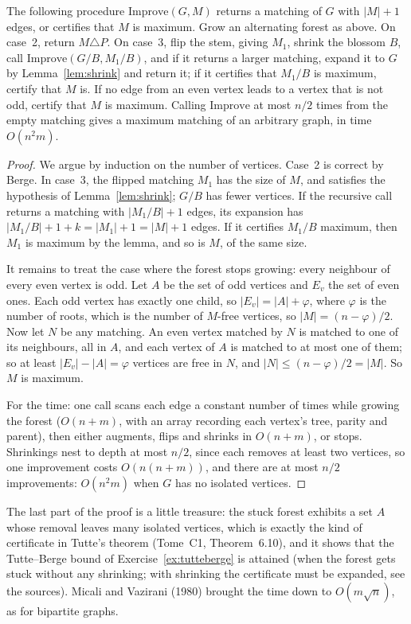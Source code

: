 \begin{theorem}[Edmonds, 1965]\label{thm:blossom}
The following procedure $\mathrm{Improve}(G,M)$ returns a matching of $G$ with $|M|+1$ edges, or certifies that $M$ is maximum. Grow an alternating forest as above. On case~2, return $M\triangle P$. On case~3, flip the stem, giving $M_1$, shrink the blossom $B$, call
$\mathrm{Improve}(G/B,M_1/B)$, and if it returns a larger matching, expand it to $G$ by Lemma~\ref{lem:shrink} and return it; if it certifies that $M_1/B$ is maximum, certify that $M$ is. If no edge from an even vertex leads to a vertex that is not odd,
certify that $M$ is maximum. Calling $\mathrm{Improve}$ at most $n/2$ times from the empty matching gives a maximum matching of an arbitrary graph, in time $O(n^2m)$.
\end{theorem}
\begin{proof}
We argue by induction on the number of vertices. Case~2 is correct by Berge. In case~3, the flipped matching $M_1$ has the size of $M$, and satisfies the hypothesis of Lemma~\ref{lem:shrink}; $G/B$ has fewer vertices. If the recursive call
returns a matching with $|M_1/B|+1$ edges, its expansion has $|M_1/B|+1+k=|M_1|+1=|M|+1$ edges. If it certifies $M_1/B$ maximum, then $M_1$ is maximum by the lemma, and so is $M$, of the same size.

It remains to treat the case where the forest stops growing: every neighbour of every even vertex is odd. Let $A$ be the set of odd vertices and $E_v$ the set of even ones. Each odd vertex has exactly one child, so $|E_v|=|A|+\varphi$, where $\varphi$ is the number of roots, which
is the number of $M$-free vertices, so $|M|=(n-\varphi)/2$. Now let $N$ be any matching. An even vertex matched by $N$ is matched to one of its neighbours, all in $A$, and each vertex of $A$ is matched to at most one of them; so at least $|E_v|-|A|=\varphi$ vertices are
free in $N$, and $|N|\le(n-\varphi)/2=|M|$. So $M$ is maximum.

For the time: one call scans each edge a constant number of times while growing the forest ($O(n+m)$, with an array recording each vertex's tree, parity and parent), then either augments, flips and shrinks in $O(n+m)$, or stops. Shrinkings nest to depth at most $n/2$,
since each removes at least two vertices, so one improvement costs $O(n(n+m))$, and there are at most $n/2$ improvements: $O(n^2m)$ when $G$ has no isolated vertices.
\end{proof}

The last part of the proof is a little treasure: the stuck forest exhibits a set $A$ whose removal leaves many isolated vertices, which is exactly the kind of certificate in Tutte's theorem (Tome~C1, Theorem~6.10), and it shows that the
Tutte--Berge bound of Exercise~\ref{ex:tutteberge} is attained (when the forest gets stuck without any shrinking; with shrinking the certificate must be expanded, see the sources). Micali and Vazirani (1980) brought the time down to $O(m\sqrt n)$, as for bipartite graphs.

